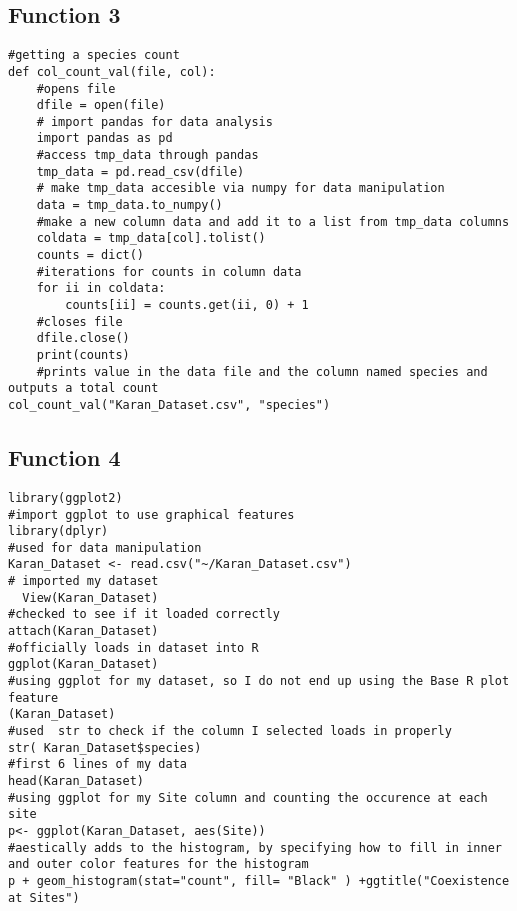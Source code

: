 \documentclass[letterpaper]{article}
\begin{document}
\subsection{Function 3 }
\begin{verbatim}
#getting a species count
def col_count_val(file, col):
    #opens file
    dfile = open(file)
    # import pandas for data analysis
    import pandas as pd
    #access tmp_data through pandas
    tmp_data = pd.read_csv(dfile)
    # make tmp_data accesible via numpy for data manipulation
    data = tmp_data.to_numpy()
    #make a new column data and add it to a list from tmp_data columns
    coldata = tmp_data[col].tolist()
    counts = dict()
    #iterations for counts in column data
    for ii in coldata:
        counts[ii] = counts.get(ii, 0) + 1
    #closes file
    dfile.close()
    print(counts)
    #prints value in the data file and the column named species and outputs a total count
col_count_val("Karan_Dataset.csv", "species")

\end{verbatim}

\subsection{Function 4}
\begin{verbatim}
library(ggplot2)
#import ggplot to use graphical features
library(dplyr)
#used for data manipulation
Karan_Dataset <- read.csv("~/Karan_Dataset.csv")
# imported my dataset
  View(Karan_Dataset)
#checked to see if it loaded correctly
attach(Karan_Dataset)
#officially loads in dataset into R
ggplot(Karan_Dataset)
#using ggplot for my dataset, so I do not end up using the Base R plot feature
(Karan_Dataset)
#used  str to check if the column I selected loads in properly
str( Karan_Dataset$species)
#first 6 lines of my data
head(Karan_Dataset)
#using ggplot for my Site column and counting the occurence at each site
p<- ggplot(Karan_Dataset, aes(Site))
#aestically adds to the histogram, by specifying how to fill in inner and outer color features for the histogram
p + geom_histogram(stat="count", fill= "Black" ) +ggtitle("Coexistence at Sites")
\end{verbatim}
\end{document}
